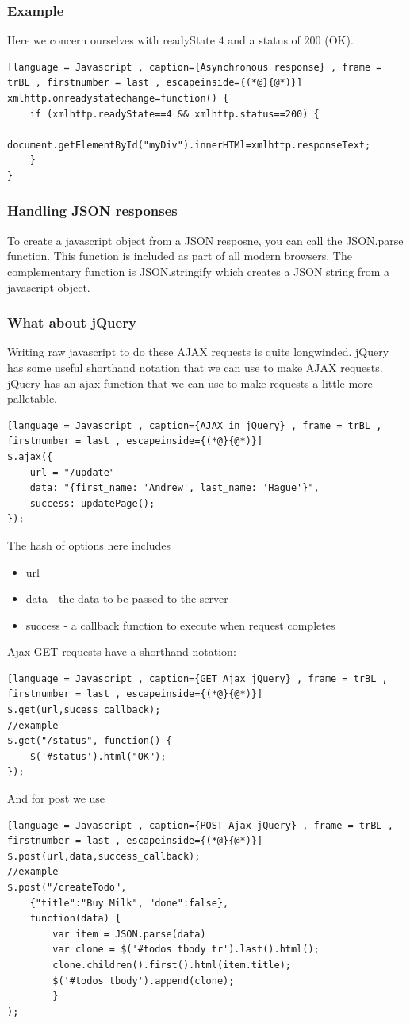 \documentclass[a4paper]{article}
\theoremstyle{plain}
\theoremstyle{definition}
\theoremstyle{remark}
\begin{document}
\begin{flushleft}
\subsubsection{Example}
Here we concern ourselves with readyState $4$ and a status of $200$ (OK).

\begin{lstlisting}[language = Javascript , caption={Asynchronous response} , frame = trBL , firstnumber = last , escapeinside={(*@}{@*)}]
xmlhttp.onreadystatechange=function() {
	if (xmlhttp.readyState==4 && xmlhttp.status==200) {
		document.getElementById("myDiv").innerHTMl=xmlhttp.responseText;
	}
}
\end{lstlisting}
\subsubsection{Handling JSON responses}
To create a javascript object from a JSON resposne, you can call the JSON.parse function. This function is included as part of all modern browsers. The complementary function is JSON.stringify which creates a JSON string from a javascript object. 
\subsubsection{What about jQuery}
Writing raw javascript to do these AJAX requests is quite longwinded. jQuery has some useful shorthand notation that we can use to make AJAX requests. jQuery has an ajax function that we can use to make requests a little more palletable. 
\begin{lstlisting}[language = Javascript , caption={AJAX in jQuery} , frame = trBL , firstnumber = last , escapeinside={(*@}{@*)}]
$.ajax({
	url = "/update"
	data: "{first_name: 'Andrew', last_name: 'Hague'}",
	success: updatePage();
});
\end{lstlisting}
The hash of options here includes
\begin{itemize}
	\item url
	\item data - the data to be passed to the server
	\item success - a callback function to execute when request completes
\end{itemize}
Ajax GET requests have a shorthand notation:
\begin{lstlisting}[language = Javascript , caption={GET Ajax jQuery} , frame = trBL , firstnumber = last , escapeinside={(*@}{@*)}]
$.get(url,sucess_callback);
//example
$.get("/status", function() {
	$('#status').html("OK");
});
\end{lstlisting}
And for post we use
\begin{lstlisting}[language = Javascript , caption={POST Ajax jQuery} , frame = trBL , firstnumber = last , escapeinside={(*@}{@*)}]
$.post(url,data,success_callback);
//example
$.post("/createTodo",
	{"title":"Buy Milk", "done":false},
	function(data) {
		var item = JSON.parse(data)
		var clone = $('#todos tbody tr').last().html();
		clone.children().first().html(item.title);
		$('#todos tbody').append(clone);
		}
);
\end{lstlisting}

\end{flushleft}
\end{document}
